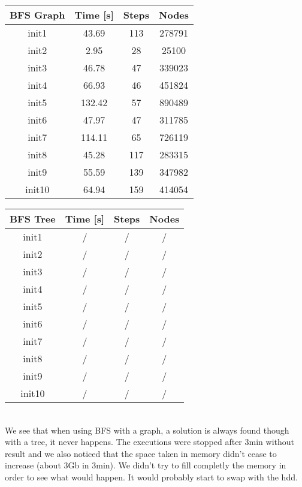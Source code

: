 \documentclass[a4paper,10pt]{article}
\begin{document}
	\vspace{0.5cm}
	\begin{tabular}{|c||c|c|c|}
		\hline 
		\textbf{BFS Graph} & \textbf{Time [s]} & \textbf{Steps} & \textbf{Nodes} \\ 
		\hline 
		init1 & 43.69 & 113 & 278791 \\ 
		\hline 
		init2 & 2.95 & 28 & 25100 \\ 
		\hline 
		init3 & 46.78 & 47 & 339023 \\ 
		\hline 
		init4 & 66.93 & 46 & 451824 \\ 
		\hline 
		init5 & 132.42 & 57 & 890489 \\ 
		\hline 
		init6 & 47.97 & 47 & 311785 \\ 
		\hline 
		init7 & 114.11 & 65 & 726119 \\ 
		\hline 
		init8 & 45.28 & 117 & 283315 \\ 
		\hline 
		init9 & 55.59 & 139 & 347982 \\ 
		\hline 
		init10 & 64.94 & 159 & 414054 \\ 
		\hline 
	\end{tabular}
	\hspace{0.5cm}
	\begin{tabular}{|c||c|c|c|}
		\hline 
		\textbf{BFS Tree} & \textbf{Time [s]} & \textbf{Steps} & \textbf{Nodes} \\ 
		\hline 
		init1 & / & / & / \\ 
		\hline 
		init2 & / & / & / \\ 
		\hline 
		init3 & / & / & / \\ 
		\hline 
		init4 & / & / & / \\ 
		\hline 
		init5 & / & / & / \\ 
		\hline 
		init6 & / & / & / \\ 
		\hline 
		init7 & / & / & / \\ 
		\hline 
		init8 & / & / & / \\ 
		\hline 
		init9 & / & / & / \\ 
		\hline 
		init10 & / & / & / \\ 
		\hline 
	\end{tabular}
	\vspace{0.5cm}\\
	We see that when using BFS with a graph, a solution is always found though with a tree, it never happens. The executions were stopped after 3min without result and we also noticed that the space taken in memory didn't cease to increase (about 3Gb in 3min). We didn't try to fill completly the memory in order to see what would happen. It would probably start to swap with the hdd.
	\vspace{1cm}
	
\end{document}
